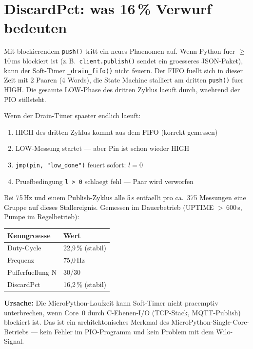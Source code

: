 \documentclass[11pt,a4paper]{article}
\begin{document}
\section{DiscardPct: was 16\,\% Verwurf bedeuten}

Mit blockierendem \texttt{push()} tritt ein neues Phaenomen auf.
Wenn Python fuer $\geq$\,10\,ms blockiert ist (z.\,B.\ \texttt{client.publish()}
sendet ein groesseres JSON-Paket), kann der Soft-Timer \texttt{\_drain\_fifo()}
nicht feuern.
Der FIFO fuellt sich in dieser Zeit mit 2 Paaren (4 Words), die State Machine
stalliert am dritten \texttt{push()} fuer HIGH.
Die gesamte LOW-Phase des dritten Zyklus laeuft durch, waehrend der PIO stillsteht.

Wenn der Drain-Timer spaeter endlich laeuft:
\begin{enumerate}
  \item HIGH des dritten Zyklus kommt aus dem FIFO (korrekt gemessen)
  \item LOW-Messung startet --- aber Pin ist schon wieder HIGH
  \item \texttt{jmp(pin, "low\_done")} feuert sofort: $l = 0$
  \item Pruefbedingung \texttt{l > 0} schlaegt fehl --- Paar wird verworfen
\end{enumerate}

Bei 75\,Hz und einem Publish-Zyklus alle 5\,s entfaellt pro ca.\ 375 Messungen
eine Gruppe auf dieses Stallereignis.
Gemessen im Dauerbetrieb (UPTIME $>$\,600\,s, Pumpe im Regelbetrieb):

\begin{center}
\begin{tabular}{ll}
\toprule
\textbf{Kenngroesse} & \textbf{Wert} \\
\midrule
Duty-Cycle           & 22{,}9\,\% (stabil) \\
Frequenz             & 75{,}0\,Hz \\
Pufferfuellung N     & 30/30 \\
DiscardPct           & 16{,}2\,\% (stabil) \\
\bottomrule
\end{tabular}
\end{center}

\textbf{Ursache:} Die MicroPython-Laufzeit kann Soft-Timer nicht praeemptiv
unterbrechen, wenn Core~0 durch C-Ebenen-I/O (TCP-Stack, MQTT-Publish) blockiert ist.
Das ist ein architektonisches Merkmal des MicroPython-Single-Core-Betriebs ---
kein Fehler im PIO-Programm und kein Problem mit dem Wilo-Signal.
\end{document}
